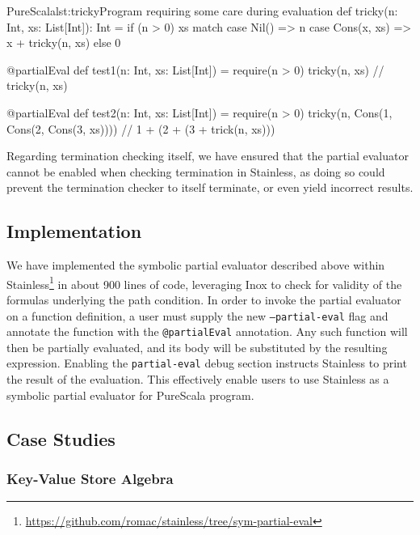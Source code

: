 \documentclass[a4paper,twoside]{article}
\newcommand{\stt}[1]{\texttt{\small{#1}}}
\begin{document}
\begin{Code}{PureScala}{lst:tricky}{Program requiring some care during evaluation}
def tricky(n: Int, xs: List[Int]): Int = {
  if (n > 0) {
    xs match {
      case Nil()       => n
      case Cons(x, xs) => x + tricky(n, xs)
    }
  } else {
    0
  }
}

@partialEval
def test1(n: Int, xs: List[Int]) = {
  require(n > 0)
  tricky(n, xs) // tricky(n, xs)
}

@partialEval
def test2(n: Int, xs: List[Int]) = {
  require(n > 0)
  tricky(n, Cons(1, Cons(2, Cons(3, xs)))) // 1 + (2 + (3 + trick(n, xs)))
}
\end{Code}

Regarding termination checking itself, we have ensured that the partial evaluator cannot be enabled when checking termination in Stainless, as doing so could prevent the termination checker to itself terminate, or even yield incorrect results.

\subsection{Implementation}

We have implemented the symbolic partial evaluator described above within Stainless\footnote{\url{https://github.com/romac/stainless/tree/sym-partial-eval}} in about 900 lines of code, leveraging Inox to check for validity of the formulas underlying the path condition. In order to invoke the partial evaluator on a function definition, a user must supply the new \stt{--partial-eval} flag and annotate the function with the \stt{@partialEval} annotation. Any such function will then be partially evaluated, and its body will be substituted by the resulting expression. Enabling the \stt{partial-eval} debug section instructs Stainless to print the result of the evaluation. This effectively enable users to use Stainless as a symbolic partial evaluator for PureScala program.

\subsection{Case Studies}
\label{symcases}

\subsubsection{Key-Value Store Algebra}
\end{document}
